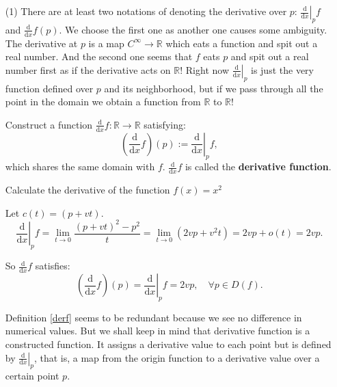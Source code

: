 \begin{itemize}
	\item[(1)] There are at least two notations of denoting the derivative over $p$:
		$\left.\frac{\mathrm{d}}{\mathrm{d}x}\right|_p f$ and $\frac{\mathrm{d}}{\mathrm{d}x}f(p)$.
		We choose the first one as another one causes some ambiguity. The derivative at $p$ is a map $C^{\infty}\to \mathbb{R}$
		which eats a function and spit out a real number. And the second one seems that $f$ eats $p$ and spit out a real number first
		as if the derivative acts on $\mathbb{R}$! Right now $\left.\frac{\mathrm{d}}{\mathrm{d}x}\right|_p$ is just the very function defined
		over $p$ and its neighborhood, but if we pass through all the point in the domain we obtain a function from $\mathbb{R}$ to $\mathbb{R}$!
		
		\begin{definition}
			Construct a function $\frac{\mathrm{d}}{\mathrm{d}x}f: \mathbb{R}\to\mathbb{R}$ satisfying:
			\[\left(\frac{\mathrm{d}}{\mathrm{d}x}f\right)(p) := \left.\frac{\mathrm{d}}{\mathrm{d}x}\right|_p f,\]
			which shares the same domain with $f$. $\frac{\mathrm{d}}{\mathrm{d}x}f$ is called the \textbf{derivative function}.
            \label{derf}
		\end{definition}

		\begin{example}
			Calculate the derivative of the function $f(x)=x^2$
			\begin{solution}
			Let $c(t)=(p+vt)$.
			\[
				\left.\frac{\mathrm{d}}{\mathrm{d}x}\right|_p f =
				\lim_{t\to 0}\frac{(p+vt)^2-p^2}{t} =
				\lim_{t\to 0}(2vp+v^2t) = 2vp + o(t) = 2vp.
			\]
			
			So $\frac{\mathrm{d}}{\mathrm{d}x}f$ satisfies:
			\[
				\left(\frac{\mathrm{d}}{\mathrm{d}x}f\right)(p) =
				\left.\frac{\mathrm{d}}{\mathrm{d}x}\right|_p f = 2vp,
				\quad \forall p \in D(f).
			\]		
			\end{solution}
		\end{example}

		Definition \ref{derf} seems to be redundant because we see no difference in numerical values.
		But we shall keep in mind that derivative function is a constructed function. It assigns
		a derivative value to each point but is defined by $\left.\frac{\mathrm{d}}{\mathrm{d}x}\right|_p$, that is,
		a map from the origin function to a derivative value over a certain point $p$.


\end{itemize}
